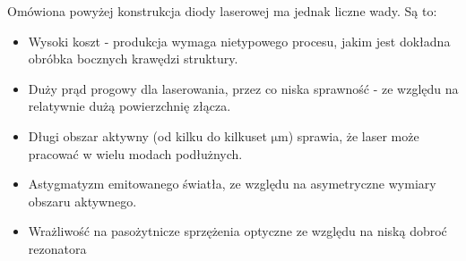 \documentclass[a4paper,10pt,twoside]{article}
\begin{document}
Omówiona powyżej konstrukcja diody laserowej ma jednak liczne wady. Są to:
\begin{itemize}
 \item Wysoki koszt - produkcja wymaga nietypowego procesu, jakim jest dokładna obróbka bocznych krawędzi struktury.
 \item Duży prąd progowy dla laserowania, przez co niska sprawność - ze względu na relatywnie dużą powierzchnię złącza.
 \item Długi obszar aktywny (od kilku do kilkuset $\mathrm{\mu m}$) sprawia, że laser może pracować w wielu modach podłużnych.
 \item Astygmatyzm emitowanego światła, ze względu na asymetryczne wymiary obszaru aktywnego.
 \item Wrażliwość na pasożytnicze sprzężenia optyczne ze względu na niską dobroć rezonatora
\end{itemize}
\end{document}
